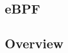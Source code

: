 \documentclass{report}
\begin{document}
\begin{spacing}{1.5}











\section{eBPF}

\subsection{Overview}


\end{spacing}
\end{document}
